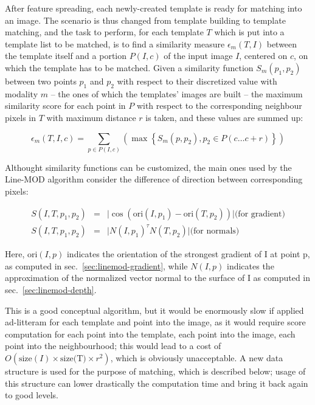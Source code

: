 After feature spreading, each newly-created template is ready for
matching into an image. The scenario is thus changed from template
building to template matching, and the task to perform, for each
template $T$ which is put into a template list to be matched, is to
find a similarity measure $\epsilon_m (T,I)$ between the template itself
and a portion $P(I,c)$ of
the input image $I$, centered on $c$, on which the template has to be matched. Given a
similarity function $S_m(p_1, p_2)$ between two points $p_1$ and $p_2$
with respect to their discretized value with modality $m$ -- the ones
of which the templates' images are built -- the maximum similarity
score for each point in $P$ with respect to the corresponding
neighbour pixels in $T$ with maximum distance $r$ is taken, and these values are summed up:

\begin{equation} \label{eqn:similarity-function}
  \epsilon_m (T,I,c)=\sum_{p\in P(I,c)} { \left( \max \left\{ S_m
      (p,p_2) , p_2 \in P(c\dots c+r) \right\} \right) }
\end{equation}

Althought similarity functions can be customized, the main ones used
by the Line-MOD algorithm consider the difference of direction between
corresponding pixels:

\begin{eqnarray}
  S(I,T,p_1,p_2) & = & \lvert \cos(\text{ori}(I,p_1) -
  \text{ori}(T,p_2)) \rvert \text{(for gradient)} \\
  S(I,T,p_1,p_2) & = & \lvert N(I,p_1)^{\tau} N(T,p_2)\rvert \text{(for normals)}
\end{eqnarray}

Here, $\text{ori}(I,p)$ indicates the orientation of the strongest
gradient of I at point p, as computed in
sec.~\ref{sec:linemod-gradient}, while $N(I,p)$ indicates the
approximation of the normalized vector normal to the surface of I as
computed in sec.~\ref{sec:linemod-depth}.

This is a good conceptual algorithm, but it would be enormously slow
if applied ad-litteram for each template and point into the image, as
it would require score computation for each point into the template,
each point into the image, each point into the neighbourhood; this
would lead to a cost of $O(\text{size}(I)\times \text{size(T)}\times
r^2)$, which is obviously unacceptable. A new data structure is used for
the purpose of matching, which is described below; usage of this
structure can lower drastically the computation time and bring it back
again to good levels.

